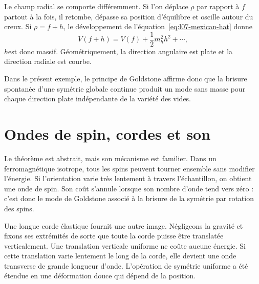 Le champ radial se comporte différemment. Si l’on déplace \(\rho\) par rapport à \(f\) partout à la fois, il retombe, dépasse sa position d’équilibre et oscille autour du creux. Si \(\rho=f+h\), le développement de l’équation~\eqref{eq:l07-mexican-hat} donne
\begin{equation}
  V(f+h)=V(f)+\frac12m_h^2h^2+\cdots,
\end{equation}
\(h\)est donc massif. Géométriquement, la direction angulaire est plate et la direction radiale est courbe.

\begin{classroomqa}
\end{classroomqa}

Dans le présent exemple, le principe de Goldstone affirme donc que la brisure spontanée d’une symétrie globale continue produit un mode sans masse pour chaque direction plate indépendante de la variété des vides.

\section{Ondes de spin, cordes et son}

Le théorème est abstrait, mais son mécanisme est familier. Dans un ferromagnétique isotrope, tous les spins peuvent tourner ensemble sans modifier l’énergie. Si l’orientation varie très lentement à travers l’échantillon, on obtient une onde de spin. Son coût s’annule lorsque son nombre d’onde tend vers zéro : c’est donc le mode de Goldstone associé à la brisure de la symétrie par rotation des spins.

Une longue corde élastique fournit une autre image. Négligeons la gravité et fixons ses extrémités de sorte que toute la corde puisse être translatée verticalement. Une translation verticale uniforme ne coûte aucune énergie. Si cette translation varie lentement le long de la corde, elle devient une onde transverse de grande longueur d’onde. L’opération de symétrie uniforme a été étendue en une déformation douce qui dépend de la position.


